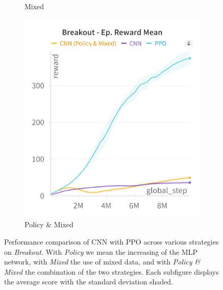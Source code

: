 \begin{figure}[ht]
\begin{subfigure}[b]{0.32\textwidth}
        \caption{Mixed}
        \label{fig:breakout_cnn_mixed}
    \end{subfigure}
    \hfill
    \begin{subfigure}[b]{0.32\textwidth}
        \centering
        \includegraphics[width=\textwidth]{images/breakout_cnn_policy_mixed}
        \caption{Policy \& Mixed}
        \label{fig:breakout_cnn_expert_policy}
    \end{subfigure}
    \caption{Performance comparison of CNN with PPO across various strategies on \textit{Breakout}. With \textit{Policy} we mean the increasing of the MLP network, with \textit{Mixed} the use of mixed data, and with \textit{Policy \& Mixed} the combination of the two strategies. Each subfigure displays the average score with the standard deviation shaded.}
    \label{fig:breakout_cnn_study}
\end{figure}

